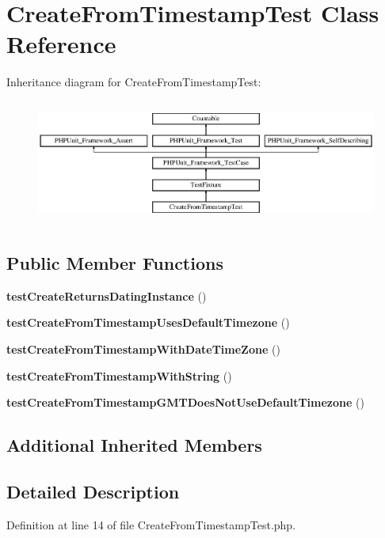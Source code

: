 \section{Create\+From\+Timestamp\+Test Class Reference}
\label{class_create_from_timestamp_test}
Inheritance diagram for Create\+From\+Timestamp\+Test\+:\begin{figure}[H]
\begin{center}
\leavevmode
\includegraphics[height=4.129793cm]{class_create_from_timestamp_test}
\end{center}
\end{figure}
\subsection*{Public Member Functions}
\begin{DoxyCompactItemize}
\item 
{\bf test\+Create\+Returns\+Dating\+Instance} ()
\item 
{\bf test\+Create\+From\+Timestamp\+Uses\+Default\+Timezone} ()
\item 
{\bf test\+Create\+From\+Timestamp\+With\+Date\+Time\+Zone} ()
\item 
{\bf test\+Create\+From\+Timestamp\+With\+String} ()
\item 
{\bf test\+Create\+From\+Timestamp\+G\+M\+T\+Does\+Not\+Use\+Default\+Timezone} ()
\end{DoxyCompactItemize}
\subsection*{Additional Inherited Members}


\subsection{Detailed Description}


Definition at line 14 of file Create\+From\+Timestamp\+Test.\+php.



